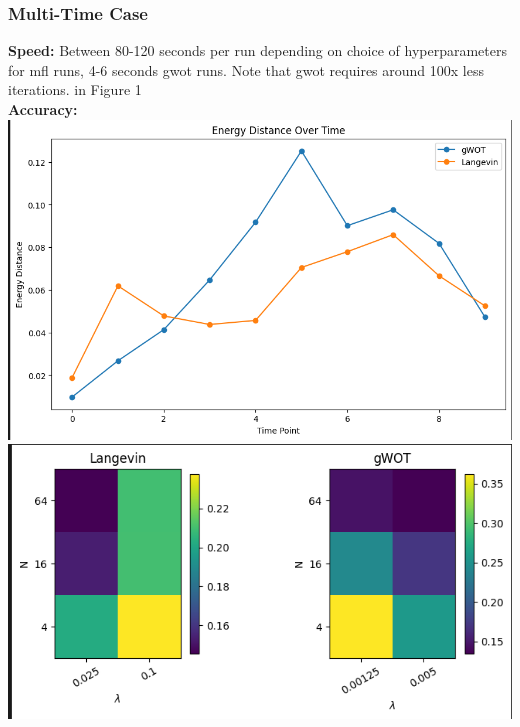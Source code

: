 \documentclass{article}
\begin{document}
\subsubsection{Multi-Time Case }
\textbf{Speed:} Between 80-120 seconds per run depending on choice of hyperparameters for mfl runs, 4-6 seconds gwot runs. Note that gwot requires around 100x less iterations. in Figure 1\\
\textbf{Accuracy:}\\
\includegraphics[width=\textwidth, height=0.4\textheight]{Smooth Schrodinger Bridges/benchmark-results/LangevinNativePlot.png}\\
\includegraphics[width=\textwidth, height=0.4\textheight]{Smooth Schrodinger Bridges/benchmark-results/LangevinNativePlot2.png}\\
\end{document}

